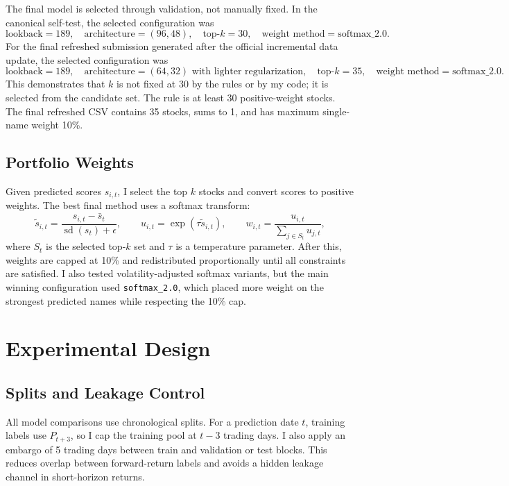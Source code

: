 \documentclass[11pt]{article}
\begin{document}
The final model is selected through validation, not manually fixed. In the
canonical self-test, the selected configuration was
\[
    \text{lookback}=189,\quad
    \text{architecture}=(96,48),\quad
    \text{top-}k=30,\quad
    \text{weight method}=\text{softmax\_2.0}.
\]
For the final refreshed submission generated after the official incremental
data update, the selected configuration was
\[
    \text{lookback}=189,\quad
    \text{architecture}=(64,32)\text{ with lighter regularization},\quad
    \text{top-}k=35,\quad
    \text{weight method}=\text{softmax\_2.0}.
\]
This demonstrates that \(k\) is not fixed at 30 by the rules or by my code; it
is selected from the candidate set. The rule is at least 30 positive-weight
stocks. The final refreshed CSV contains 35 stocks, sums to 1, and has maximum
single-name weight 10\%.

\subsection{Portfolio Weights}

Given predicted scores \(s_{i,t}\), I select the top \(k\) stocks and convert
scores to positive weights. The best final method uses a softmax transform:
\[
    \tilde{s}_{i,t} =
    \frac{s_{i,t}-\bar{s}_t}{\operatorname{sd}(s_t)+\epsilon},
    \qquad
    u_{i,t} = \exp(\tau \tilde{s}_{i,t}),
    \qquad
    w_{i,t} = \frac{u_{i,t}}{\sum_{j\in S_t} u_{j,t}},
\]
where \(S_t\) is the selected top-\(k\) set and \(\tau\) is a temperature
parameter. After this, weights are capped at 10\% and redistributed
proportionally until all constraints are satisfied. I also tested
volatility-adjusted softmax variants, but the main winning configuration used
\texttt{softmax\_2.0}, which placed more weight on the strongest predicted
names while respecting the 10\% cap.

\section{Experimental Design}

\subsection{Splits and Leakage Control}

All model comparisons use chronological splits. For a prediction date
\(t\), training labels use \(P_{t+3}\), so I cap the training pool at
\(t-3\) trading days. I also apply an embargo of 5 trading days between train
and validation or test blocks. This reduces overlap between forward-return
labels and avoids a hidden leakage channel in short-horizon returns.
\end{document}
